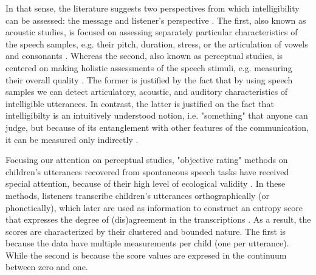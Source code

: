 In that sense, the literature suggests two perspectives from which intelligibility can be assessed: the message and listener’s perspective \citep{Boonen_et_al_2020, Boonen_et_al_2021}. The first, also known as acoustic studies, is focused on assessing separately particular characteristics of the speech samples, e.g. their pitch, duration, stress, or the articulation of vowels and consonants \citep{Rowe_et_al_2018}. Whereas the second, also known as perceptual studies, is centered on making holistic assessments of the speech stimuli, e.g. measuring their overall quality \citep{Boonen_et_al_2020, Boonen_et_al_2021}. The former is justified by the fact that by using speech samples we can detect articulatory, acoustic, and auditory characteristics of intelligible utterances. In contrast, the latter is justified on the fact that intelligibilty is an intuitively understood notion, i.e. "something" that anyone can judge, but because of its entanglement with other features of the communication, it can be measured only indirectly \citep{Guilford_1954, Stevens_1946}.

\begin{comment}	
	
	On both instances, the stimuli (children's utterances) can be generated from reading at loud, contextualized utterances, or spontaneous speech tasks\footnote{ordered on increasing level of ecological validity \citep{Flipsen_2006, Ertmer_2011}}.
	
	Based on their description, it seems that perceptual are more subjective than acoustic studies, as they do not rely on "objective" measurements, i.e. time duration, wave amplitude, among others, available in the former. However, for the case of SI, there are objective and subjective assessment methodologies.
		
\end{comment}

Focusing our attention on perceptual studies, "objective rating" methods on children's utterances recovered from spontaneous speech tasks have received special attention, because of their high level of ecological validity \citep{Boonen_et_al_2021, Ertmer_2011, Flipsen_2006, Hustad_et_al_2020}. In these methods, listeners transcribe children's utterances orthographically (or phonetically), which later are used as information to construct an entropy score that expresses the degree of (dis)agreement in the transcriptions \citep{Boonen_et_al_2021, Shannon_1948}. As a result, the scores are characterized by their clustered and bounded nature. The first is because the data have multiple measurements per child (one per utterance). While the second is because the score values are expresed in the continuum between zero and one.

